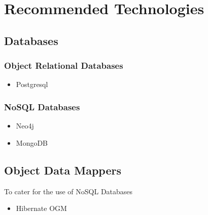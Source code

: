 \section{Recommended Technologies}
\subsection{Databases}
\subsubsection{Object Relational Databases}
\begin{itemize}
	\item Postgresql
\end{itemize}

\subsubsection{NoSQL Databases}
\begin{itemize}
	\item Neo4j
	\item MongoDB
\end{itemize}

\subsection{Object Data Mappers}
To cater for the use of NoSQL Databases
\begin{itemize}
	\item Hibernate OGM
\end{itemize}
